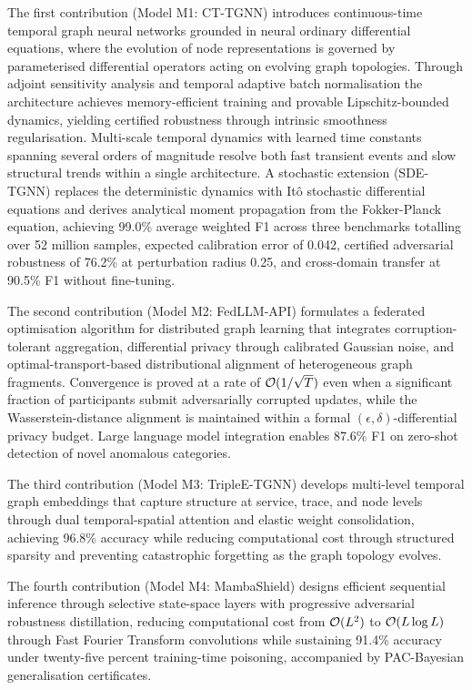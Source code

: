The first contribution (Model M1: CT-TGNN) introduces continuous-time temporal graph neural networks grounded in neural ordinary differential equations, where the evolution of node representations is governed by parameterised differential operators acting on evolving graph topologies. Through adjoint sensitivity analysis and temporal adaptive batch normalisation the architecture achieves memory-efficient training and provable Lipschitz-bounded dynamics, yielding certified robustness through intrinsic smoothness regularisation. Multi-scale temporal dynamics with learned time constants spanning several orders of magnitude resolve both fast transient events and slow structural trends within a single architecture. A stochastic extension (SDE-TGNN) replaces the deterministic dynamics with It\^{o} stochastic differential equations and derives analytical moment propagation from the Fokker-Planck equation, achieving 99.0\% average weighted F1 across three benchmarks totalling over 52 million samples, expected calibration error of 0.042, certified adversarial robustness of 76.2\% at perturbation radius 0.25, and cross-domain transfer at 90.5\% F1 without fine-tuning.

The second contribution (Model M2: FedLLM-API) formulates a federated optimisation algorithm for distributed graph learning that integrates corruption-tolerant aggregation, differential privacy through calibrated Gaussian noise, and optimal-transport-based distributional alignment of heterogeneous graph fragments. Convergence is proved at a rate of $\mathcal{O}(1/\sqrt{T})$ even when a significant fraction of participants submit adversarially corrupted updates, while the Wasserstein-distance alignment is maintained within a formal $(\epsilon,\delta)$-differential privacy budget. Large language model integration enables 87.6\% F1 on zero-shot detection of novel anomalous categories.

The third contribution (Model M3: TripleE-TGNN) develops multi-level temporal graph embeddings that capture structure at service, trace, and node levels through dual temporal-spatial attention and elastic weight consolidation, achieving 96.8\% accuracy while reducing computational cost through structured sparsity and preventing catastrophic forgetting as the graph topology evolves.

The fourth contribution (Model M4: MambaShield) designs efficient sequential inference through selective state-space layers with progressive adversarial robustness distillation, reducing computational cost from $\mathcal{O}(L^{2})$ to $\mathcal{O}(L\log L)$ through Fast Fourier Transform convolutions while sustaining 91.4\% accuracy under twenty-five percent training-time poisoning, accompanied by PAC-Bayesian generalisation certificates.

